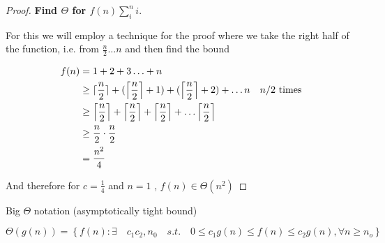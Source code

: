 \documentclass[10pt]{article}
\begin{document}
\begin{proof}

	\textbf{Find $ \Theta $ for $ f(n) \sum^n_i i $}.

	For this we will employ a technique for the proof where we take the right half of the function, i.e. from $ \frac{n}{2} \ldots n $ and then find the bound

	\begin{equation}
		\begin{split}
			f(n) &= 1 + 2 + 3 \ldots + n \\
			 &\ge \lceil \frac{n}{2} \rceil + (\left\lceil \frac{n}{2} \right\rceil + 1) + (\left\lceil \frac{n}{2} \right\rceil + 2) + \ldots n \quad \text{$ n/2 $ times} \\
			 &\ge \left\lceil \frac{n}{2} \right\rceil +   \left\lceil \frac{n}{2} \right\rceil + \left\lceil \frac{n}{2} \right\rceil +  \ldots \left\lceil \frac{n}{2} \right\rceil \\
			 &\ge \frac{n}{2} \cdot \frac{n}{2} \\
			 &= \frac{n^2}{4} \\
		\end{split}
	\end{equation}

	And therefore for $ c = \frac{1}{4} $  and $ n = 1 $ , $ f(n) \in \Theta(n^2) $ 
	
	
\end{proof}



\begin{definition}
	Big $ \Theta $  notation (asymptotically tight bound)

	\begin{equation}
		\Theta(g(n)) = \left\{ f(n) : \exists \quad c_1 c_2, n_0 \quad s.t. \quad 0 \le  c_1 g(n) \le  f(n) \le  c_2 g(n), \forall n \ge  n_o   \right\}
		\label{eq:358:bigTheta}
	\end{equation}
\end{definition}
\end{document}
